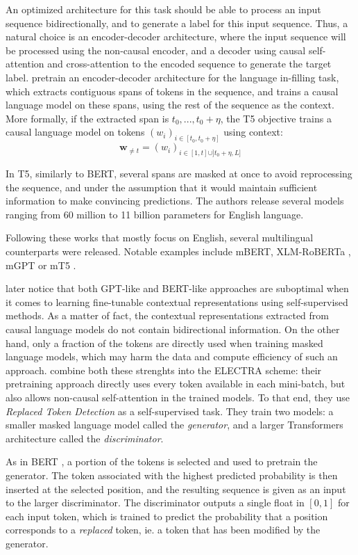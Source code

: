 An optimized architecture for this task should be able to process an input sequence bidirectionally, and to generate a label for this input sequence. Thus, a natural choice is an encoder-decoder architecture, where the input sequence will be processed using the non-causal encoder, and a decoder using causal self-attention and cross-attention to the encoded sequence to generate the target label. \citet{2020t5} pretrain an encoder-decoder architecture for the language in-filling task, which extracts contiguous spans of tokens in the sequence, and trains a causal language model on these spans, using the rest of the sequence as the context. More formally, if the extracted span is $t_0, ..., t_0+\eta$, the T5 objective trains a causal language model on tokens $(w_i)_{i \in [t_0, t_0+\eta]}$ using context:
$$
\mathbf{w}_{\neq t} = (w_i)_{i \in [1, t] \cup ]t_0+\eta, L]}
$$

In T5, similarly to BERT, several spans are masked at once to avoid reprocessing the sequence, and under the assumption that it would maintain sufficient information to make convincing predictions. The authors release several models ranging from 60 million to 11 billion parameters for English language.

Following these works that mostly focus on English, several multilingual counterparts were released. Notable examples include mBERT, XLM-RoBERTa \citep{conneau2019unsupervised}, mGPT \citep{mgpt} or mT5 \citep{xue-etal-2021-mt5}.

\citet{electra} later notice that both GPT-like and BERT-like approaches are suboptimal when it comes to learning fine-tunable contextual representations using self-supervised methods. As a matter of fact, the contextual representations extracted from causal language models do not contain bidirectional information. On the other hand, only a fraction of the tokens are directly used when training masked language models, which may harm the data and compute efficiency of such an approach. \citet{electra} combine both these strenghts into the ELECTRA scheme: their pretraining approach directly uses every token available in each mini-batch, but also allows non-causal self-attention in the trained models. To that end, they use \textit{Replaced Token Detection} as a self-supervised task. They train two models: a smaller masked language model called the \textit{generator}, and a larger Transformers architecture called the \textit{discriminator}.

As in BERT \citep{devlin-etal-2019-bert}, a portion of the tokens is selected and used to pretrain the generator. The token associated with the highest predicted probability is then inserted at the selected position, and the resulting sequence is given as an input to the larger discriminator. The discriminator outputs a single float in $[0, 1]$ for each input token, which is trained to predict the probability that a position corresponds to a \textit{replaced} token, ie. a token that has been modified by the generator.


